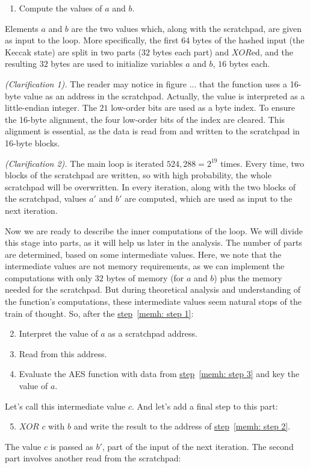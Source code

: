 \begin{enumerate}
  \item \label{memh: step 1} Compute the values of $a$ and $b$.
\end{enumerate}
Elements $a$ and $b$ are the two values which, along with the scratchpad, are given as input to the loop. More specifically, the first $64$ bytes of the hashed input (the Keccak state) are split in two parts ($32$ bytes each part) and $XOR$ed, and the resulting $32$ bytes are used to initialize variables $a$ and $b$, $16$ bytes each.

\noindent \emph{(Clarification 1).} The reader may notice in figure ... that the function uses a 16-byte value as an address in the scratchpad. Actually, the value is interpreted as a little-endian integer. The $21$ low-order bits are used as a byte index. To ensure the 16-byte alignment, the four low-order bits of the index are cleared. This alignment is essential, as the data is read from and written to the scratchpad in 16-byte blocks.

\noindent \emph{(Clarification 2).} The main loop is iterated $524,288 = 2^{19}$ times. Every time, two blocks of the scratchpad are written, so with high probability, the whole scratchpad will be overwritten. In every iteration, along with the two blocks of the scratchpad, values $a'$ and $b'$ are computed, which are used as input to the next iteration.

Now we are ready to describe the inner computations of the loop. We will divide this stage into parts, as it will help us later in the analysis. The number of parts are determined, based on some intermediate values. Here, we note that the intermediate values are not memory requirements, as we can implement the computations with only $32$ bytes of memory (for $a$ and $b$) plus the memory needed for the scratchpad. But during theoretical analysis and understanding of the function's computations, these intermediate values seem natural stops of the train of thought. So, after the \hyperref[memh: step 1]{step}~\ref{memh: step 1}:

\begin{enumerate}
  \setcounter{enumi}{1}
  \item \label{memh: step 2} Interpret the value of $a$ as a scratchpad address.
  \item \label{memh: step 3} Read from this address.
  \item Evaluate the AES function with data from \hyperref[memh: step 3]{step}~\ref{memh: step 3} and key the value of $a$.
\end{enumerate}
Let's call this intermediate value $c$. And let's add a final step to this part:
\begin{enumerate}
  \setcounter{enumi}{4}
  \item $XOR$ $c$ with $b$ and write the result to the address of \hyperref[memh: step 2]{step}~\ref{memh: step 2}.
\end{enumerate}
The value $c$ is passed as $b'$, part of the input of the next iteration. The second part involves another read from the scratchpad:

